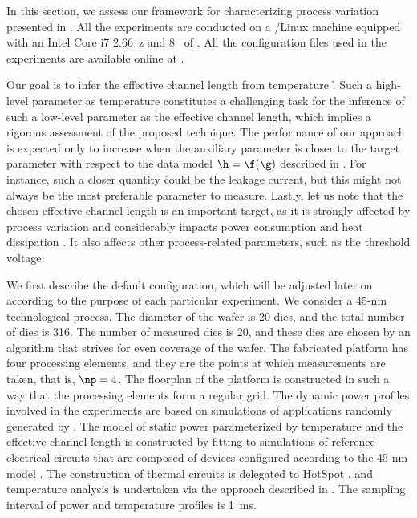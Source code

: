 In this section, we assess our framework for characterizing process variation
presented in . All the experiments are conducted on a
/Linux machine equipped with an Intel Core i7 2.66~z and
8~ of . All the configuration files used in the experiments are
available online at \cite{eslab2014a}.

Our goal is to infer the effective channel length \g from temperature \h. Such a
high-level parameter as temperature constitutes a challenging task for the
inference of such a low-level parameter as the effective channel length, which
implies a rigorous assessment of the proposed technique. The performance of our
approach is expected only to increase when the auxiliary parameter \h is closer
to the target parameter \g with respect to the data model $\h = \f(\g)$
described in . For instance, such a closer quantity \h
could be the leakage current, but this might not always be the most preferable
parameter to measure. Lastly, let us note that the chosen effective channel
length is an important target, as it is strongly affected by process variation
and considerably impacts power consumption and heat dissipation
\cite{chandrakasan2000, srivastava2010, juan2011, juan2012}. It also affects
other process-related parameters, such as the threshold voltage.

We first describe the default configuration, which will be adjusted later on
according to the purpose of each particular experiment. We consider a 45-nm
technological process. The diameter of the wafer is 20 dies, and the total
number of dies \nd is 316. The number of measured dies \hnd is 20, and these
dies are chosen by an algorithm that strives for even coverage of the wafer. The
fabricated platform has four processing elements, and they are the points at
which measurements are taken, that is, $\np = 4$. The floorplan of the platform
is constructed in such a way that the processing elements form a regular grid.
The dynamic power profiles involved in the experiments are based on simulations
of applications randomly generated by  \cite{dick1998}. The model of
static power parameterized by temperature and the effective channel length is
constructed by fitting to  simulations of reference electrical
circuits that are composed of  devices \cite{bsim} configured
according to the 45-nm   model \cite{ptm}. The construction of
thermal  circuits is delegated to HotSpot \cite{skadron2003}, and
temperature analysis is undertaken via the approach described in
. The sampling interval of power and temperature
profiles is 1~ms.

